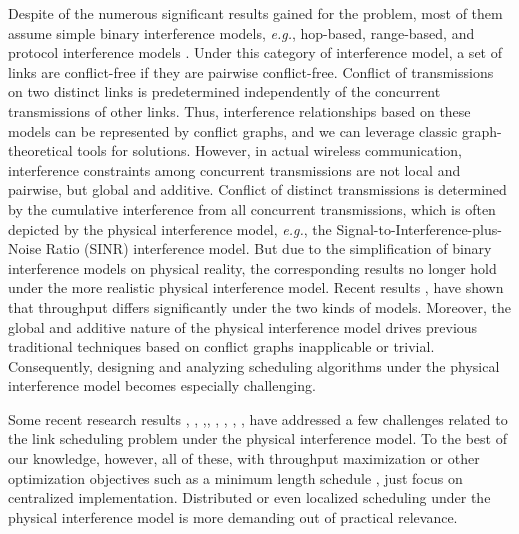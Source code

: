\documentclass[journal]{IEEEtran}
\begin{document}
Despite of the numerous significant results gained for the problem, most of them assume simple binary interference models, \emph{e.g.}, hop-based, range-based, and protocol interference models \cite{S:phy6}. Under this category of interference model, a set of links are conflict-free if they are pairwise conflict-free. Conflict of transmissions on two distinct links is predetermined independently of the concurrent transmissions of other links. Thus, interference relationships based on these models can be represented by conflict graphs, and we can leverage classic graph-theoretical tools for solutions. However, in actual wireless communication, interference constraints among concurrent transmissions are not local and pairwise, but global and additive. Conflict of distinct transmissions is determined by the cumulative interference from all concurrent transmissions, which is often depicted by the  physical interference model, \emph{e.g.},  the Signal-to-Interference-plus-Noise Ratio (SINR) interference model. But due to the simplification of binary interference models on physical reality, the corresponding results no longer hold under the more realistic physical interference model. Recent results \cite{S:phy13}, \cite{S:phy14} have shown that throughput differs significantly under the two kinds of models. Moreover, the global and additive nature of the physical interference model drives previous traditional techniques based on conflict graphs inapplicable or trivial. Consequently, designing and analyzing scheduling algorithms under the physical interference model becomes especially challenging.

Some recent research results \cite{S:phy1}, \cite{S:phy6}, \cite{S:phy2},\cite{multicast}, \cite{S:phy5}, \cite{S:phy8}, \cite{S:phy12}, \cite{S:phy15}, \cite{S:phy9}  have addressed a few challenges related to the link scheduling problem under the physical interference model. To the best of our knowledge, however, all of these, with throughput maximization or other optimization objectives such as a minimum length schedule \cite{S:phy6}, just focus on centralized implementation.  Distributed or even localized scheduling under the physical interference model is  more demanding out of practical relevance.
\end{document}
